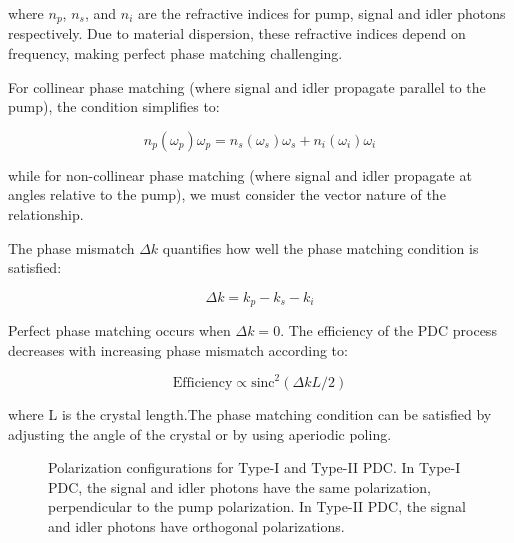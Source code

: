 \documentclass[
  a4paper,
]{book}
\begin{document}
where \(n_p\), \(n_s\), and \(n_i\) are the refractive indices for pump,
signal and idler photons respectively. Due to material dispersion, these
refractive indices depend on frequency, making perfect phase matching
challenging.

For collinear phase matching (where signal and idler propagate parallel
to the pump), the condition simplifies to:

\[
n_p(\omega_p)\omega_p = n_s(\omega_s)\omega_s + n_i(\omega_i)\omega_i
\]

while for non-collinear phase matching (where signal and idler propagate
at angles relative to the pump), we must consider the vector nature of
the relationship.

The phase mismatch \(\Delta k\) quantifies how well the phase matching
condition is satisfied:

\[
\Delta k = k_p - k_s - k_i
\]

Perfect phase matching occurs when \(\Delta k = 0\). The efficiency of
the PDC process decreases with increasing phase mismatch according to:

\[
\text{Efficiency} \propto \text{sinc}^2(\Delta k L/2)
\]

where L is the crystal length.The phase matching condition can be
satisfied by adjusting the angle of the crystal or by using aperiodic
poling.

\begin{figure}


\caption{\label{fig-pdc2}Polarization configurations for Type-I and
Type-II PDC. In Type-I PDC, the signal and idler photons have the same
polarization, perpendicular to the pump polarization. In Type-II PDC,
the signal and idler photons have orthogonal polarizations.}

\end{figure}%
\end{document}
